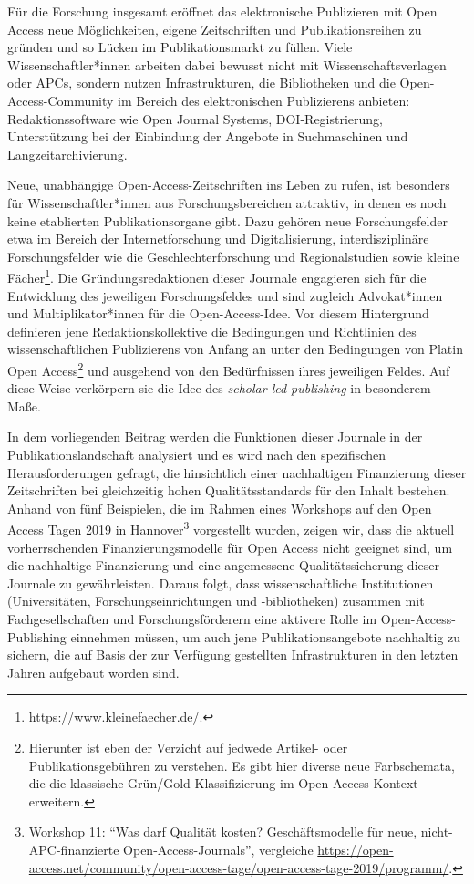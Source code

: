 \documentclass[a4paper,
fontsize=11pt,
oneside,
numbers=noperiodatend,
parskip=half-,
bibliography=totoc,
final
]{scrartcl}
\begin{document}
Für die Forschung insgesamt eröffnet das elektronische Publizieren mit
Open Access neue Möglichkeiten, eigene Zeitschriften und
Publikationsreihen zu gründen und so Lücken im Publikationsmarkt zu
füllen. Viele Wissenschaftler*innen arbeiten dabei bewusst nicht mit
Wissenschaftsverlagen oder APCs, sondern nutzen Infrastrukturen, die
Bibliotheken und die Open-Access-Community im Bereich des elektronischen
Publizierens anbieten: Redaktionssoftware wie Open Journal Systems,
DOI-Registrierung, Unterstützung bei der Einbindung der Angebote in
Suchmaschinen und Langzeitarchivierung.

Neue, unabhängige Open-Access-Zeitschriften ins Leben zu rufen, ist
besonders für Wissenschaftler*innen aus Forschungsbereichen attraktiv,
in denen es noch keine etablierten Publikationsorgane gibt. Dazu gehören
neue Forschungsfelder etwa im Bereich der Internetforschung und
Digitalisierung, interdisziplinäre Forschungsfelder wie die
Geschlechterforschung und Regionalstudien sowie kleine Fächer\footnote{\url{https://www.kleinefaecher.de/}.}.
Die Gründungsredaktionen dieser Journale engagieren sich für die
Entwicklung des jeweiligen Forschungsfeldes und sind zugleich
Advokat*innen und Multiplikator*innen für die Open-Access-Idee. Vor
diesem Hintergrund definieren jene Redaktionskollektive die Bedingungen
und Richtlinien des wissenschaftlichen Publizierens von Anfang an unter
den Bedingungen von Platin Open Access\footnote{Hierunter ist eben der
  Verzicht auf jedwede Artikel- oder Publikationsgebühren zu verstehen.
  Es gibt hier diverse neue Farbschemata, die die klassische
  Grün/Gold-Klassifizierung im Open-Access-Kontext erweitern.} und
ausgehend von den Bedürfnissen ihres jeweiligen Feldes. Auf diese Weise
verkörpern sie die Idee des \emph{scholar-led publishing} in besonderem
Maße.

In dem vorliegenden Beitrag werden die Funktionen dieser Journale in der
Publikationslandschaft analysiert und es wird nach den spezifischen
Herausforderungen gefragt, die hinsichtlich einer nachhaltigen
Finanzierung dieser Zeitschriften bei gleichzeitig hohen
Qualitätsstandards für den Inhalt bestehen. Anhand von fünf Beispielen,
die im Rahmen eines Workshops auf den Open Access Tagen 2019 in
Hannover\footnote{Workshop 11: \enquote{Was darf Qualität kosten?
  Geschäftsmodelle für neue, nicht-APC-finanzierte
  Open-Access-Journals}, vergleiche
  \url{https://open-access.net/community/open-access-tage/open-access-tage-2019/programm/}.}
vorgestellt wurden, zeigen wir, dass die aktuell vorherrschenden
Finanzierungsmodelle für Open Access nicht geeignet sind, um die
nachhaltige Finanzierung und eine angemessene Qualitätssicherung dieser
Journale zu gewährleisten. Daraus folgt, dass wissenschaftliche
Institutionen (Universitäten, Forschungseinrichtungen und \hbox{-bibliotheken)}
zusammen mit Fachgesellschaften und Forschungsförderern eine aktivere
Rolle im Open-Access-Publishing einnehmen müssen, um auch jene
Publikationsangebote nachhaltig zu sichern, die auf Basis der zur
Verfügung gestellten Infrastrukturen in den letzten Jahren aufgebaut
worden sind.
\end{document}
